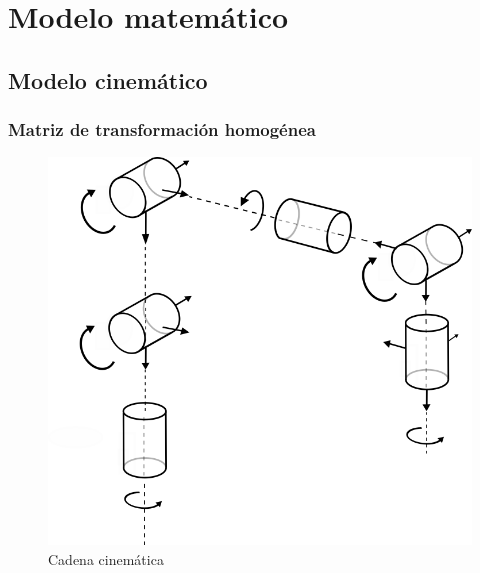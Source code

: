 \chapter{Modelo matemático}

\section{Modelo cinemático}
\subsection{Matriz de transformación homogénea}



\begin{figure}
    \centering
    \includegraphics[width=\textwidth]{./img/chapter4/kinematicchain.png}
    \caption{Cadena cinemática}
    \label{fig:kinematicchain}
\end{figure}
